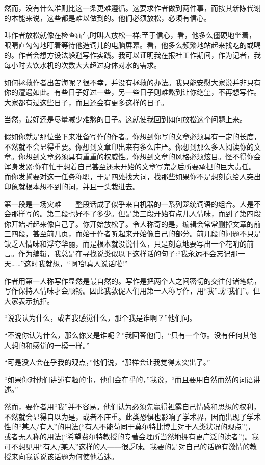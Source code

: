 然而，没有什么准则比这一条更难遵循。这要求作者做到两件事，而按其新陈代谢的本能来说，这些都是难以做到的。他们必须放松，必须有信心。

叫作者放松就像在检查疝气时叫人放松一样;至于信心，看，他多么僵硬地坐着，眼睛直勾勾地盯着等待他造词儿的电脑屏幕。看，他多么频繁地站起来找吃的或喝的。作者会想方设法躲避写作实践。我可以证明我在报社工作期间，作为记者，我每小时去饮水机的次数大大超过身体对水的需求。

如何拯救作者出苦海呢？很不幸，并没有拯救的办法。我只能安慰大家说并非只有你的遭遇如此。有些日子好过一些，另一些日子则难熬到让你绝望，不再想写作。大家都有过这些日子，而且还会有更多这样的日子。

当然，最好还是尽量减少难熬的日子。这就使我回到如何放松这个问题上来。

假如你就是那位坐下来准备写作的作者。你想到你写的文章必须具有一定的长度，不然就不会显得重要。你想到文章印出来有多么庄严。你想到那么多人阅读你的文章。你想到文章必须具有重重的权威性。你想到文章的风格必须炫目。怪不得你会浑身发紧:你在忙于想着自己甚至还未开始的文章写完之后所要承担的巨大责任。而你发誓要对这一任务称职，于是四处找大词，找那些如果你不是想刻意给人突出印象就根本想不到的词，并且一头栽进去。

第一段是一场灾难——整段话成了似乎来自机器的一系列笼统词语的组合。人是不会那样写的。第二段也好不了多少。但是第三段开始有点儿人情味，而到了第四段你开始听起来像自己了。你开始放松了。令人称奇的是，编辑会常常删掉文章的前三四段，甚至前几页，而始于作者听起来开始像自己的部分。前几段的问题不只是缺乏人情味和浮夸华丽，而是根本就没说什么，只是刻意地要写出一个花哨的前言。作为编辑，我总是在寻找说类似以下这样话的句子:“我永远不会忘记那一天……”这时我就想，“啊哈!真人说话啦!”

作者用第一人称写作显然是最自然的。写作是把两个人之间密切的交往付诸笔端，写作保持人情味才会顺畅。因此我敦促人们用第一人称写作，用“我”或“我们”。但大家表示抗拒。

“说我认为什么，或者我感觉什么，那个我是谁啊？”他们问。

“不说你认为什么，那么你又是谁呢？”我回答他们，“只有一个你。没有任何其他人想的和感觉的一模一样。”

“可是没人会在乎我的观点，”他们说，“那样会让我觉得太突出了。”

“如果你对他们讲述有趣的事，他们会在乎的，”我说，“而且要用自然而然的词语讲述。”

然而，要作者用“我”并不容易。他们认为必须先赢得袒露自己情感和思想的权利，不然就会显得自以为是，或者不庄重。此类恐惧也影响了学术界，因而出现了学术性的“某人/有人”的用法(“有人不能苟同于莫尔特比博士对于人类状况的观点”)，或者无人称的用法(“希望费尔特教授的专著会理所当然地拥有更广泛的读者”)。我可不想见用“有人/某人”这样的人——很乏味。我要的是对自己的话题有激情的教授来向我诉说该话题为何使他着迷。

